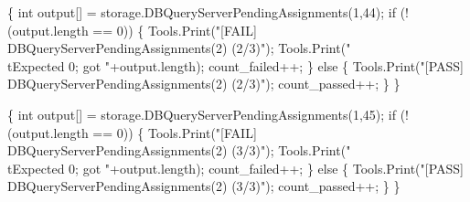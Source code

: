 \documentclass{article}
\def\nwendcode{\endtrivlist \endgroup}
\let\nwdocspar=\par
\begin{document}
\{
  int output[] = storage.DBQueryServerPendingAssignments(1,44);
  if (!(output.length == 0)) \{
    Tools.Print("[FAIL] DBQueryServerPendingAssignments(2) (2/3)");
    Tools.Print("\\tExpected 0; got "+output.length);
    count_failed++;
  \} else \{
    Tools.Print("[PASS] DBQueryServerPendingAssignments(2) (2/3)");
    count_passed++;
  \}
\}
\nwendcode{}\nwdocspar
\nwenddocs{}\endmoddef{}
\{
  int output[] = storage.DBQueryServerPendingAssignments(1,45);
  if (!(output.length == 0)) \{
    Tools.Print("[FAIL] DBQueryServerPendingAssignments(2) (3/3)");
    Tools.Print("\\tExpected 0; got "+output.length);
    count_failed++;
  \} else \{
    Tools.Print("[PASS] DBQueryServerPendingAssignments(2) (3/3)");
    count_passed++;
  \}
\}
\nwendcode{}\nwdocspar
\end{document}
